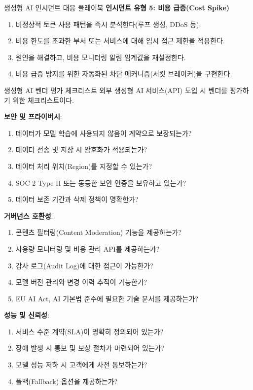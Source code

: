 \begin{practicaltool}{생성형 AI 인시던트 대응 플레이북}
\textbf{인시던트 유형 5: 비용 급증(Cost Spike)}
\begin{enumerate}
 \item 비정상적 토큰 사용 패턴을 즉시 분석한다(루프 생성, DDoS 등).
 \item 비용 한도를 초과한 부서 또는 서비스에 대해 임시 접근 제한을 적용한다.
 \item 원인을 해결하고, 비용 모니터링 알림 임계값을 재설정한다.
 \item 비용 급증 방지를 위한 자동화된 차단 메커니즘(서킷 브레이커)을 구현한다.
\end{enumerate}
\end{practicaltool}

\begin{practicaltool}{생성형 AI 벤더 평가 체크리스트}
외부 생성형 AI 서비스(API) 도입 시 벤더를 평가하기 위한 체크리스트이다.

\textbf{보안 및 프라이버시}:
\begin{enumerate}
 \item 데이터가 모델 학습에 사용되지 않음이 계약으로 보장되는가?
 \item 데이터 전송 및 저장 시 암호화가 적용되는가?
 \item 데이터 처리 위치(Region)를 지정할 수 있는가?
 \item SOC 2 Type II 또는 동등한 보안 인증을 보유하고 있는가?
 \item 데이터 보존 기간과 삭제 정책이 명확한가?
\end{enumerate}

\textbf{거버넌스 호환성}:
\begin{enumerate}
 \item 콘텐츠 필터링(Content Moderation) 기능을 제공하는가?
 \item 사용량 모니터링 및 비용 관리 API를 제공하는가?
 \item 감사 로그(Audit Log)에 대한 접근이 가능한가?
 \item 모델 버전 관리와 변경 이력 추적이 가능한가?
 \item EU AI Act, AI 기본법 준수에 필요한 기술 문서를 제공하는가?
\end{enumerate}

\textbf{성능 및 신뢰성}:
\begin{enumerate}
 \item 서비스 수준 계약(SLA)이 명확히 정의되어 있는가?
 \item 장애 발생 시 통보 및 보상 절차가 마련되어 있는가?
 \item 모델 성능 저하 시 고객에게 사전 통보하는가?
 \item 폴백(Fallback) 옵션을 제공하는가?
\end{enumerate}


\end{practicaltool}
